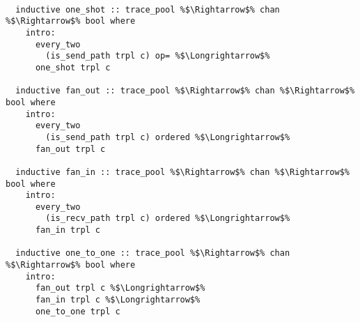 \documentclass{article}
\begin{document}
\begin{lstlisting}[style=codestyle1, escapechar=\%]

  inductive one_shot :: trace_pool %$\Rightarrow$% chan %$\Rightarrow$% bool where
    intro:
      every_two
        (is_send_path trpl c) op= %$\Longrightarrow$% 
      one_shot trpl c

  inductive fan_out :: trace_pool %$\Rightarrow$% chan %$\Rightarrow$% bool where
    intro:
      every_two
        (is_send_path trpl c) ordered %$\Longrightarrow$%
      fan_out trpl c

  inductive fan_in :: trace_pool %$\Rightarrow$% chan %$\Rightarrow$% bool where
    intro:
      every_two
        (is_recv_path trpl c) ordered %$\Longrightarrow$% 
      fan_in trpl c

  inductive one_to_one :: trace_pool %$\Rightarrow$% chan %$\Rightarrow$% bool where
    intro:
      fan_out trpl c %$\Longrightarrow$%
      fan_in trpl c %$\Longrightarrow$% 
      one_to_one trpl c

  \end{lstlisting}
\end{document}
